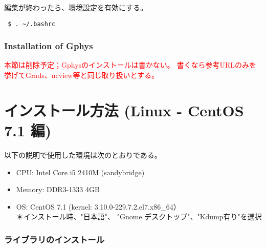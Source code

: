 編集が終わったら、環境設定を有効にする。
\begin{verbatim}
 $ . ~/.bashrc
\end{verbatim}


\subsubsection{Installation of Gphys}

\textcolor{red}{\large 本節は削除予定；Gphysのインストールは書かない。
書くなら参考URLのみを挙げてGrads、ncview等と同じ取り扱いとする。}





\section{インストール方法 (Linux - CentOS 7.1 編)}

以下の説明で使用した環境は次のとおりである。
\begin{itemize}
\item CPU: Intel Core i5 2410M (sandybridge)
\item Memory: DDR3-1333 4GB
\item OS: CentOS 7.1 (kernel: 3.10.0-229.7.2.el7.x86\_64）\\
{\small ＊インストール時、"日本語"、 "Gnome デスクトップ"、"Kdump有り"を選択}
\end{itemize}

\subsubsection{ライブラリのインストール}

